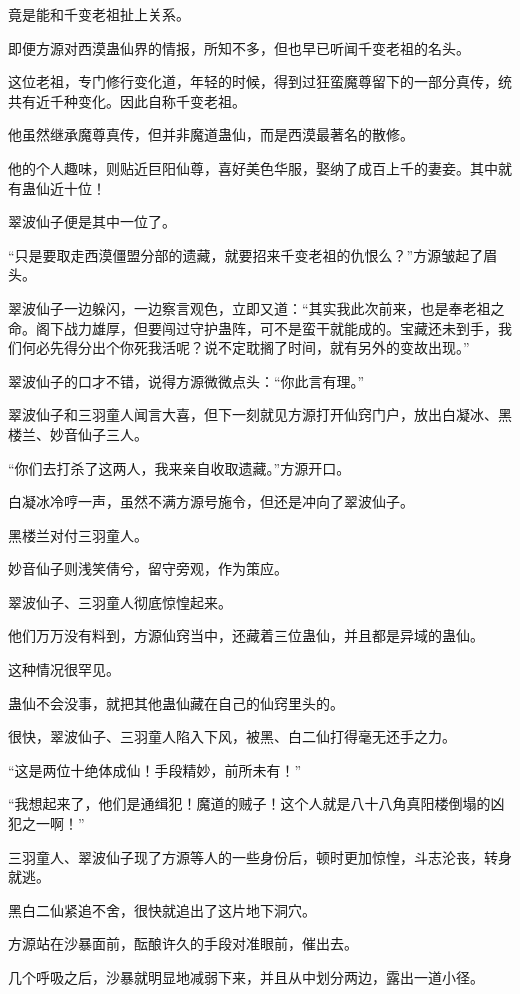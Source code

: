 \begin{this_body}
竟是能和千变老祖扯上关系。

即便方源对西漠蛊仙界的情报，所知不多，但也早已听闻千变老祖的名头。

这位老祖，专门修行变化道，年轻的时候，得到过狂蛮魔尊留下的一部分真传，统共有近千种变化。因此自称千变老祖。

他虽然继承魔尊真传，但并非魔道蛊仙，而是西漠最著名的散修。

他的个人趣味，则贴近巨阳仙尊，喜好美色华服，娶纳了成百上千的妻妾。其中就有蛊仙近十位！

翠波仙子便是其中一位了。

“只是要取走西漠僵盟分部的遗藏，就要招来千变老祖的仇恨么？”方源皱起了眉头。

翠波仙子一边躲闪，一边察言观色，立即又道：“其实我此次前来，也是奉老祖之命。阁下战力雄厚，但要闯过守护蛊阵，可不是蛮干就能成的。宝藏还未到手，我们何必先得分出个你死我活呢？说不定耽搁了时间，就有另外的变故出现。”

翠波仙子的口才不错，说得方源微微点头：“你此言有理。”

翠波仙子和三羽童人闻言大喜，但下一刻就见方源打开仙窍门户，放出白凝冰、黑楼兰、妙音仙子三人。

“你们去打杀了这两人，我来亲自收取遗藏。”方源开口。

白凝冰冷哼一声，虽然不满方源号施令，但还是冲向了翠波仙子。

黑楼兰对付三羽童人。

妙音仙子则浅笑倩兮，留守旁观，作为策应。

翠波仙子、三羽童人彻底惊惶起来。

他们万万没有料到，方源仙窍当中，还藏着三位蛊仙，并且都是异域的蛊仙。

这种情况很罕见。

蛊仙不会没事，就把其他蛊仙藏在自己的仙窍里头的。

很快，翠波仙子、三羽童人陷入下风，被黑、白二仙打得毫无还手之力。

“这是两位十绝体成仙！手段精妙，前所未有！”

“我想起来了，他们是通缉犯！魔道的贼子！这个人就是八十八角真阳楼倒塌的凶犯之一啊！”

三羽童人、翠波仙子现了方源等人的一些身份后，顿时更加惊惶，斗志沦丧，转身就逃。

黑白二仙紧追不舍，很快就追出了这片地下洞穴。

方源站在沙暴面前，酝酿许久的手段对准眼前，催出去。

几个呼吸之后，沙暴就明显地减弱下来，并且从中划分两边，露出一道小径。


\end{this_body}
